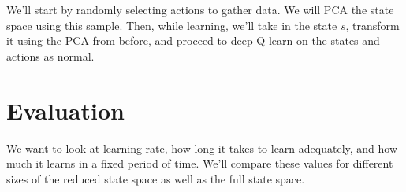 \documentclass[11pt]{article}
\begin{document}
We'll start by randomly selecting actions to gather data. We will PCA the state space using this sample. Then, while learning, we'll take in the state $s$, transform it using the PCA from before, and proceed to deep Q-learn on the states and actions as normal. 

\section{Evaluation}

We want to look at learning rate, how long it takes to learn adequately, and how much it learns in a fixed period of time. We'll compare these values for different sizes of the reduced state space as well as the full state space. 







\end{document}
